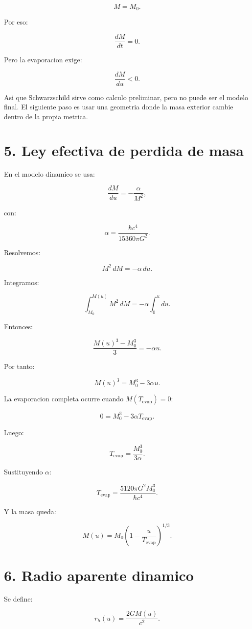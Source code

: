 ﻿\documentclass[11pt,a4paper]{article}
\begin{document}
\[
M=M_0.
\]

Por eso:

\[
\frac{dM}{dt}=0.
\]

Pero la evaporacion exige:

\[
\frac{dM}{du}<0.
\]

Asi que Schwarzschild sirve como calculo preliminar, pero no puede ser el modelo final. El siguiente paso es usar una geometria donde la masa exterior cambie dentro de la propia metrica.

\section{5. Ley efectiva de perdida de masa}

En el modelo dinamico se usa:

\[
\frac{dM}{du}
=
-
\frac{\alpha}{M^2},
\]

con:

\[
\alpha=
\frac{\hbar c^4}{15360\pi G^2}.
\]

Resolvemos:

\[
M^2\,dM=-\alpha\,du.
\]

Integramos:

\[
\int_{M_0}^{M(u)} M^2\,dM
=
-
\alpha\int_0^u du.
\]

Entonces:

\[
\frac{M(u)^3-M_0^3}{3}
=
-
\alpha u.
\]

Por tanto:

\[
M(u)^3
=
M_0^3-3\alpha u.
\]

La evaporacion completa ocurre cuando \(M(T_{\mathrm{evap}})=0\):

\[
0
=
M_0^3-3\alpha T_{\mathrm{evap}}.
\]

Luego:

\[
T_{\mathrm{evap}}
=
\frac{M_0^3}{3\alpha}.
\]

Sustituyendo \(\alpha\):

\[
T_{\mathrm{evap}}
=
\frac{5120\pi G^2 M_0^3}{\hbar c^4}.
\]

Y la masa queda:

\[
M(u)
=
M_0
\left(
1-\frac{u}{T_{\mathrm{evap}}}
\right)^{1/3}.
\]

\section{6. Radio aparente dinamico}

Se define:

\[
r_h(u)
=
\frac{2GM(u)}{c^2}.
\]
\end{document}
